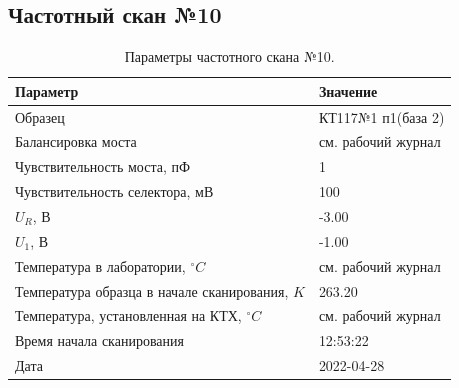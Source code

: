 \subsection{Частотный скан №10}
\begin{table}[!ht]
    \centering
    \caption{Параметры частотного скана №10.}
    \begin{tabular}{|l|l|}
        \hline
        Параметр                                       & Значение                  \\ \hline
        Образец                                        & КТ117№1 п1(база 2)        \\ \hline
        Балансировка моста                             & см. рабочий журнал        \\ \hline
        Чувствительность моста, пФ                     & 1                         \\ \hline
        Чувствительность селектора, мВ                 & 100                       \\ \hline
        $U_R$, В                                       & -3.00                     \\ \hline
        $U_1$, В                                       & -1.00                     \\ \hline
        Температура в лаборатории, $^\circ C$          & см. рабочий журнал        \\ \hline
        Температура образца в начале сканирования, $K$ & 263.20                    \\ \hline
        Температура, установленная на КТХ, $^\circ C$  & см. рабочий журнал        \\ \hline
        Время начала сканирования                      & 12:53:22                  \\ \hline
        Дата                                           & 2022-04-28                \\ \hline
    \end{tabular}
    \label{table:frequency_scan_10}
\end{table}

